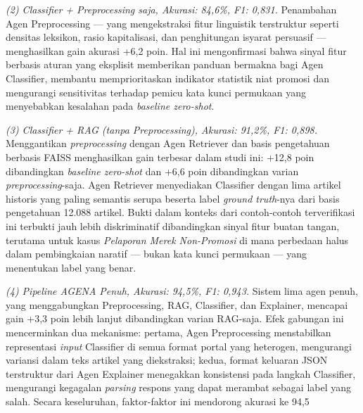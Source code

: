 \documentclass{ieeeaccess}
\begin{document}
\textit{(2) Classifier + Preprocessing saja, Akurasi: 84,6\%, F1: 0,831.} Penambahan Agen Preprocessing --- yang mengekstraksi fitur linguistik terstruktur seperti densitas leksikon, rasio kapitalisasi, dan penghitungan isyarat persuasif --- menghasilkan gain akurasi +6,2 poin. Hal ini mengonfirmasi bahwa sinyal fitur berbasis aturan yang eksplisit memberikan panduan bermakna bagi Agen Classifier, membantu memprioritaskan indikator statistik niat promosi dan mengurangi sensitivitas terhadap pemicu kata kunci permukaan yang menyebabkan kesalahan pada \textit{baseline zero-shot}.

\textit{(3) Classifier + RAG (tanpa Preprocessing), Akurasi: 91,2\%, F1: 0,898.} Menggantikan \textit{preprocessing} dengan Agen Retriever dan basis pengetahuan berbasis FAISS menghasilkan gain terbesar dalam studi ini: +12,8 poin dibandingkan \textit{baseline zero-shot} dan +6,6 poin dibandingkan varian \textit{preprocessing}-saja. Agen Retriever menyediakan Classifier dengan lima artikel historis yang paling semantis serupa beserta label \textit{ground truth}-nya dari basis pengetahuan 12.088 artikel. Bukti dalam konteks dari contoh-contoh terverifikasi ini terbukti jauh lebih diskriminatif dibandingkan sinyal fitur buatan tangan, terutama untuk kasus \textit{Pelaporan Merek Non-Promosi} di mana perbedaan halus dalam pembingkaian naratif --- bukan kata kunci permukaan --- yang menentukan label yang benar.

\textit{(4) Pipeline AGENA Penuh, Akurasi: 94,5\%, F1: 0,943.} Sistem lima agen penuh, yang menggabungkan Preprocessing, RAG, Classifier, dan Explainer, mencapai gain +3,3 poin lebih lanjut dibandingkan varian RAG-saja. Efek gabungan ini mencerminkan dua mekanisme: pertama, Agen Preprocessing menstabilkan representasi \textit{input} Classifier di semua format portal yang heterogen, mengurangi variansi dalam teks artikel yang diekstraksi; kedua, format keluaran JSON terstruktur dari Agen Explainer menegakkan konsistensi pada langkah Classifier, mengurangi kegagalan \textit{parsing} respons yang dapat merambat sebagai label yang salah. Secara keseluruhan, faktor-faktor ini mendorong akurasi ke 94,5\\%
\end{document}
